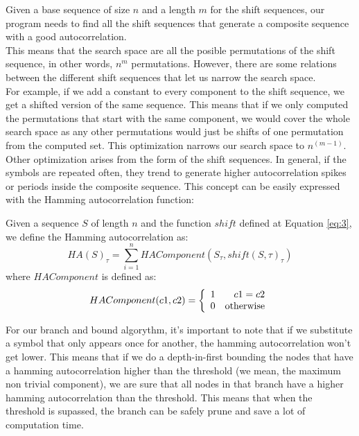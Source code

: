   Given a base sequence of size $n$ and a length $m$ for the shift sequences,
  our program needs to find all the shift sequences that generate a composite
  sequence with a good autocorrelation.\\

  This means that the search space are all the posible permutations of the
  shift sequence, in other words, $n^m$ permutations. However, there are some
  relations between the different shift sequences that let us narrow the
  search space.\\

  For example, if we add a constant to every component to the shift sequence,
  we get a shifted version of the same sequence. This means that if we only
  computed the permutations that start with the same component, we would cover
  the whole search space as any other permutations would just be shifts of
  one permutation from the computed set. This optimization narrows our
  search space to $n^{(m-1)}$.\\

  Other optimization arises from the form of the shift sequences. In general,
  if the symbols are repeated often, they trend to generate higher
  autocorrelation spikes or periods inside the composite sequence. This
  concept can be easily expressed with the Hamming autocorrelation function:\\

  \begin{definition}
    Given a sequence $S$ of length $n$ and the function $shift$ defined at
    Equation \eqref{eq:3}, we define the Hamming autocorrelation as:
      \begin{equation} \label{hamming:eq:1}
        HA(S)_{\tau} = \sum_{i=1}^{n} HAComponent(S_{\tau}, shift(S, \tau)_{\tau})
      \end{equation}
    where $HAComponent$ is defined as:
      \begin{equation}
        HAComponent(c1, c2) = \left\{\begin{array}{lr}
            1  &  c1 = c2\\
            0  & \textnormal{otherwise} \\
        \end{array}\right.
      \end{equation}
  \end{definition}

  For our branch and bound algorythm, it's important to note that if we
  substitute a symbol that only appears once for another, the hamming
  autocorrelation won't get lower. This means that if we do a depth-in-first
  bounding the nodes that have a hamming autocorrelation higher than the
  threshold (we mean, the maximum non trivial component), we are sure that all
  nodes in that branch have a higher hamming autocorrelation than the
  threshold. This means that when the threshold is supassed, the branch can
  be safely prune and save a lot of computation time.\\

